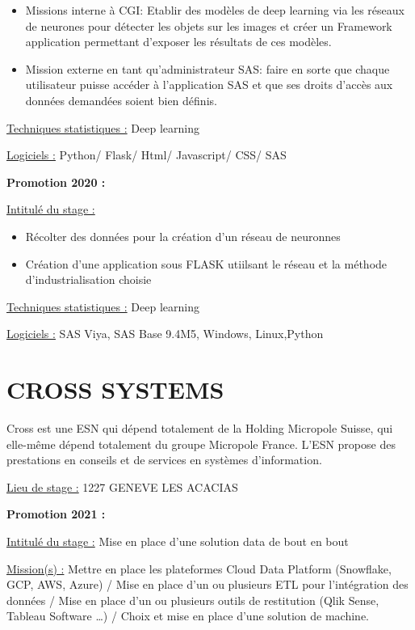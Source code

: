 \documentclass[
  letterpaper,
  DIV=11,
  numbers=noendperiod]{scrreprt}
\begin{document}
\begin{itemize}
\item
  Missions interne à CGI: Etablir des modèles de deep learning via les
  réseaux de neurones pour détecter les objets sur les images et créer
  un Framework application permettant d'exposer les résultats de ces
  modèles.
\item
  Mission externe en tant qu'administrateur SAS: faire en sorte que
  chaque utilisateur puisse accéder à l'application SAS et que ses
  droits d'accès aux données demandées soient bien définis.
\end{itemize}

\uline{Techniques statistiques :} Deep learning

\uline{Logiciels :} Python/ Flask/ Html/ Javascript/ CSS/ SAS

\textbf{Promotion 2020 :}

\uline{Intitulé du stage :}

\begin{itemize}
\item
  Récolter des données pour la création d'un réseau de neuronnes
\item
  Création d'une application sous FLASK utiilsant le réseau et la
  méthode d'industrialisation choisie
\end{itemize}

\uline{Techniques statistiques :} Deep learning

\uline{Logiciels :} SAS Viya, SAS Base 9.4M5, Windows, Linux,Python

\hypertarget{cross-systems}{%
\section{\texorpdfstring{\textbf{CROSS
SYSTEMS}}{CROSS SYSTEMS}}\label{cross-systems}}

Cross est une ESN qui dépend totalement de la Holding Micropole Suisse,
qui elle-même dépend totalement du groupe Micropole France. L'ESN
propose des prestations en conseils et de services en systèmes
d'information.

\uline{Lieu de stage :} 1227 GENEVE LES ACACIAS

\textbf{Promotion 2021 :}

\uline{Intitulé du stage :} Mise en place d'une solution data de bout en
bout

\uline{Mission(s) :} Mettre en place les plateformes Cloud Data Platform
(Snowflake, GCP, AWS, Azure) / Mise en place d'un ou plusieurs ETL pour
l'intégration des données / Mise en place d'un ou plusieurs outils de
restitution (Qlik Sense, Tableau Software \ldots) / Choix et mise en
place d'une solution de machine.
\end{document}
